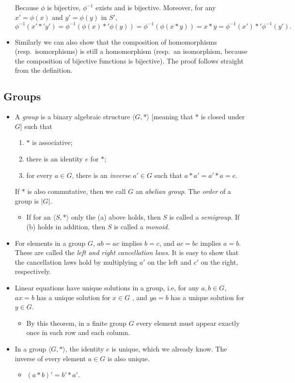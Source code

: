 \documentclass[11pt]{article}
\newcommand{\df}[1]{\textit{\textsf{#1}}}
\newcommand{\la}{\langle}
\newcommand{\ra}{\rangle}
\newcommand{\abs}[1]{\lvert #1 \rvert}
\begin{document}
\begin{itemize}
    Because $\phi$ is bijective, $\phi^{-1}$ exists and is bijective. Moreover, for any $x' = \phi(x)$ and $y' = \phi(y)$ in $S'$, \[\phi^{-1}(x' \ast' y') = \phi^{-1}(\phi(x) \ast' \phi(y)) = \phi^{-1}(\phi(x \ast y)) = x \ast y = \phi^{-1}(x') \ast' \phi^{-1}(y').\]
    \item Similarly we can also show that the composition of homomorphisms (resp.\ isomorphisms) is still a homomorphism (resp.\ an isomorphism, because the composition of bijective functions is bijective). The proof follows straight from the definition.
\end{itemize}

\subsection{Groups}
\begin{itemize}
    \item A \df{group} is a binary algebraic structure $\la G, \ast \ra$ [meaning that $\ast$ is closed under $G$] such that
    \begin{enumerate}[label=(\alph*)]
        \item $\ast$ is associative;
        \item there is an identity $e$ for $\ast$;
        \item for every $a \in G$, there is an \df{inverse} $a' \in G$ such that $a \ast a' = a' \ast a = e$.
    \end{enumerate}
    If $\ast$ is also commutative, then we call $G$ an \df{abelian group}. The \df{order} of a group is $\abs{G}$.
    \begin{itemize}
        \item If for an $\la S,\ast \ra$ only the (a) above holds, then $S$ is called a \df{semigroup}. If (b) holds in addition, then $S$ is called a \df{monoid}.
    \end{itemize}
     \item For elements in a group $G$, $ab = ac$ implies $b = c$, and $ac = bc$ implies $a = b$. These are called the \df{left and right cancellation laws}. It is easy to show that the cancellation laws hold by multiplying $a'$ on the left and $c'$ on the right, respectively.
    \item Linear equations have unique solutions in a group, i.e, for any $a,b \in G$, $ax=b$ has a unique solution for $x \in G$ , and $ya = b$ has a unique solution for $y \in G$.
    \begin{itemize}
        \item By this theorem, in a finite group $G$ every element must appear exactly once in each row and each column.
    \end{itemize}
    \item In a group $\la G,\ast \ra$, the identity $e$ is unique, which we already know. The inverse of every element $a \in G$ is also unique.
    \begin{itemize}
        \item $(a \ast b)' = b' \ast a'$.
    \end{itemize}
\end{itemize}
\end{document}
